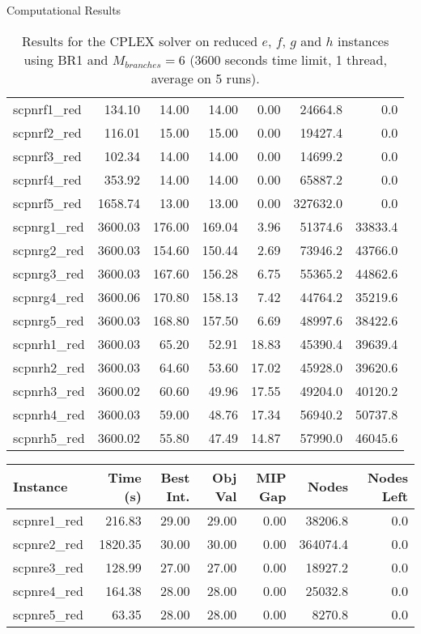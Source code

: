 \documentclass[a4paper,12pt]{mydeitesi_eng}
\begin{document}
\begin{chapter}{Computational Results}
\begin{table}[h]
\begin{center}
\begin{tabular}{l|r|r|r|r|r|r}
scpnrf1\_red & 134.10 & 14.00 & 14.00 & 0.00 & 24664.8 & 0.0\\ 
scpnrf2\_red & 116.01 & 15.00 & 15.00 & 0.00 & 19427.4 & 0.0\\ 
scpnrf3\_red & 102.34 & 14.00 & 14.00 & 0.00 & 14699.2 & 0.0\\ 
scpnrf4\_red & 353.92 & 14.00 & 14.00 & 0.00 & 65887.2 & 0.0\\ 
scpnrf5\_red & 1658.74 & 13.00 & 13.00 & 0.00 & 327632.0 & 0.0\\
\hline
 
scpnrg1\_red & 3600.03 & 176.00 & 169.04 & 3.96 & 51374.6 & 33833.4\\ 
scpnrg2\_red & 3600.03 & 154.60 & 150.44 & 2.69 & 73946.2 & 43766.0\\ 
scpnrg3\_red & 3600.03 & 167.60 & 156.28 & 6.75 & 55365.2 & 44862.6\\ 
scpnrg4\_red & 3600.06 & 170.80 & 158.13 & 7.42 & 44764.2 & 35219.6\\ 
scpnrg5\_red & 3600.03 & 168.80 & 157.50 & 6.69 & 48997.6 & 38422.6\\ 
\hline

scpnrh1\_red & 3600.03 & 65.20 & 52.91 & 18.83 & 45390.4 & 39639.4\\ 
scpnrh2\_red & 3600.03 & 64.60 & 53.60 & 17.02 & 45928.0 & 39620.6\\ 
scpnrh3\_red & 3600.02 & 60.60 & 49.96 & 17.55 & 49204.0 & 40120.2\\ 
scpnrh4\_red & 3600.03 & 59.00 & 48.76 & 17.34 & 56940.2 & 50737.8\\ 
scpnrh5\_red & 3600.02 & 55.80 & 47.49 & 14.87 & 57990.0 & 46045.6\\ 
\end{tabular}
\end{center}
\caption{Results for the CPLEX solver on reduced $e$, $f$, $g$ and $h$ instances using BR1 and $M_{branches} = 6$ (3600 seconds time limit, 1 thread, average on 5  runs).}
\label{tab:ResultBR1_M6_sparse}
\end{table}


\begin{table}[h]
\begin{center}
\begin{tabular}{l|r|r|r|r|r|r}
\textbf{Instance} & \textbf{Time (s)} & \textbf{Best Int.} & \textbf{Obj Val} & \textbf{MIP Gap} & \textbf{Nodes} & \textbf{Nodes Left}\\
\hline
scpnre1\_red & 216.83 & 29.00 & 29.00 & 0.00 & 38206.8 & 0.0\\ 
scpnre2\_red & 1820.35 & 30.00 & 30.00 & 0.00 & 364074.4 & 0.0\\ 
scpnre3\_red & 128.99 & 27.00 & 27.00 & 0.00 & 18927.2 & 0.0\\ 
scpnre4\_red & 164.38 & 28.00 & 28.00 & 0.00 & 25032.8 & 0.0\\ 
scpnre5\_red & 63.35 & 28.00 & 28.00 & 0.00 & 8270.8 & 0.0\\
\hline
 

\end{tabular}
\end{center}
\end{table}
\end{chapter}
\end{document}
